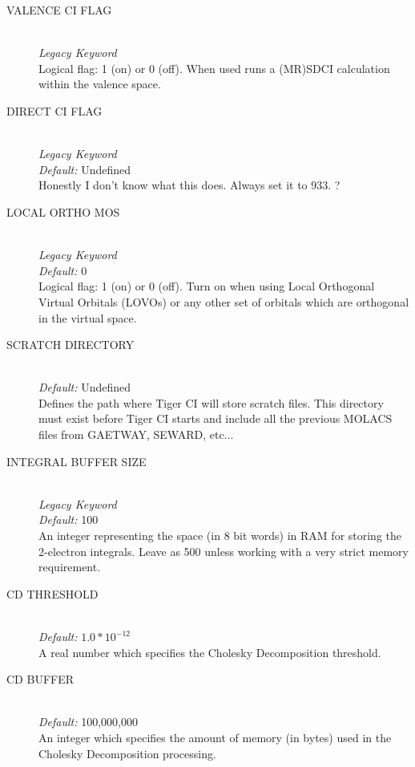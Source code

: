 \documentclass{article}
\begin{document}
\begin{description}
        \item[VALENCE CI FLAG ] \hfill \\
        \emph{Legacy Keyword}   \hfill \\
        Logical flag: 1 (on) or 0 (off). When used runs a (MR)SDCI calculation within the valence space.
        
        \item[DIRECT CI FLAG ] \hfill \\
        \emph{Legacy Keyword} \hfill \\
        \emph{Default:} Undefined \hfill \\
        Honestly I don't know what this does. Always set it to 933. ? 
        
     	\item[LOCAL ORTHO MOS] \hfill \\
     	\emph{Legacy Keyword}  \hfill \\
     	\emph{Default:} 0 \hfill \\
     	Logical flag: 1 (on) or 0 (off). Turn on when using Local Orthogonal Virtual Orbitals (LOVOs) or any other set of orbitals which are orthogonal in the virtual space.
     	
     	
        \item[SCRATCH DIRECTORY ] \hfill \\
        \emph{Default:} Undefined \hfill \\
        Defines the path where Tiger CI will store scratch files. This directory must exist before Tiger CI starts and include all the previous MOLACS files from GAETWAY, SEWARD, etc...

        \item[INTEGRAL BUFFER SIZE ] \hfill \\
        \emph{Legacy Keyword}        \hfill \\
        \emph{Default:} 100 \hfill \\
        An integer representing the space (in 8 bit words) in RAM for storing the 2-electron integrals. Leave as 500 unless working with a very strict memory requirement. 
        
        \item[CD THRESHOLD ] \hfill \\
        \emph{Default:} $1.0*10^{-12}$ \hfill \\
        A real number which specifies the Cholesky Decomposition threshold.
        
        \item[CD BUFFER ] \hfill \\
        \emph{Default:} 100,000,000 \hfill \\
        An integer which specifies the amount of memory (in bytes) used in the Cholesky Decomposition processing. 
        

\end{description}
\end{document}
